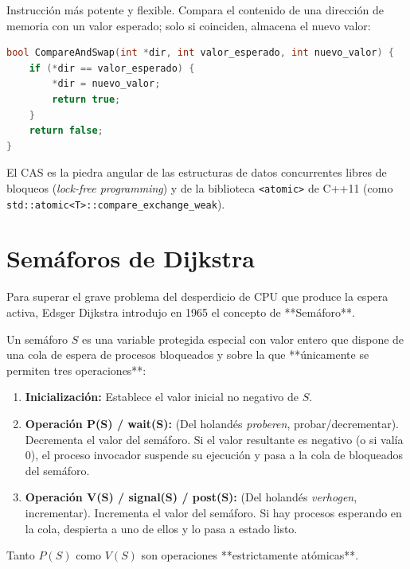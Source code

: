 \begin{definicion}
Instrucción más potente y flexible. Compara el contenido de una dirección de memoria con un valor esperado; solo si coinciden, almacena el nuevo valor:
\begin{lstlisting}[language=C++]
bool CompareAndSwap(int *dir, int valor_esperado, int nuevo_valor) {
    if (*dir == valor_esperado) {
        *dir = nuevo_valor;
        return true;
    }
    return false;
}
\end{lstlisting}
El CAS es la piedra angular de las estructuras de datos concurrentes libres de bloqueos (\textit{lock-free programming}) y de la biblioteca \texttt{<atomic>} de C++11 (como \texttt{std::atomic<T>::compare\_exchange\_weak}).
\end{definicion}

\section{Semáforos de Dijkstra}

Para superar el grave problema del desperdicio de CPU que produce la espera activa, Edsger Dijkstra introdujo en 1965 el concepto de **Semáforo**.

\begin{definicion}[Semáforo]
Un semáforo $S$ es una variable protegida especial con valor entero que dispone de una cola de espera de procesos bloqueados y sobre la que **únicamente se permiten tres operaciones**:
\begin{enumerate}
    \item \textbf{Inicialización:} Establece el valor inicial no negativo de $S$.
    \item \textbf{Operación P(S) / wait(S):} (Del holandés \textit{proberen}, probar/decrementar). Decrementa el valor del semáforo. Si el valor resultante es negativo (o si valía 0), el proceso invocador suspende su ejecución y pasa a la cola de bloqueados del semáforo.
    \item \textbf{Operación V(S) / signal(S) / post(S):} (Del holandés \textit{verhogen}, incrementar). Incrementa el valor del semáforo. Si hay procesos esperando en la cola, despierta a uno de ellos y lo pasa a estado listo.
\end{enumerate}
Tanto $P(S)$ como $V(S)$ son operaciones **estrictamente atómicas**.
\end{definicion}

